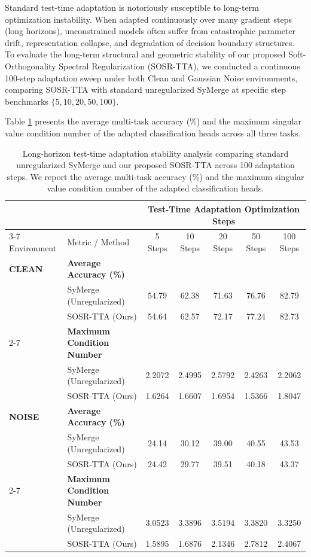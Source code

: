 \documentclass{article}
\theoremstyle{plain}
\theoremstyle{definition}
\theoremstyle{remark}
\begin{document}
Standard test-time adaptation is notoriously susceptible to long-term optimization instability. When adapted continuously over many gradient steps (long horizons), unconstrained models often suffer from catastrophic parameter drift, representation collapse, and degradation of decision boundary structures. To evaluate the long-term structural and geometric stability of our proposed Soft-Orthogonality Spectral Regularization (SOSR-TTA), we conducted a continuous 100-step adaptation sweep under both Clean and Gaussian Noise environments, comparing SOSR-TTA with standard unregularized SyMerge at specific step benchmarks $\{5, 10, 20, 50, 100\}$.

Table \ref{tab:horizon_stability_results} presents the average multi-task accuracy (\%) and the maximum singular value condition number of the adapted classification heads across all three tasks.

\begin{table}[htbp]
\caption{Long-horizon test-time adaptation stability analysis comparing standard unregularized SyMerge and our proposed SOSR-TTA across 100 adaptation steps. We report the average multi-task accuracy (\%) and the maximum singular value condition number of the adapted classification heads.}
\label{tab:horizon_stability_results}
\vskip 0.15in
\begin{center}
\begin{small}
\begin{tabular}{llccccc}
\toprule
& & \multicolumn{5}{c}{Test-Time Adaptation Optimization Steps} \\
\cmidrule{3-7}
Environment & Metric / Method & 5 Steps & 10 Steps & 20 Steps & 50 Steps & 100 Steps \\
\midrule
\textbf{CLEAN} & \textbf{Average Accuracy (\%)} & & & & & \\
 & \quad SyMerge (Unregularized) & 54.79 & 62.38 & 71.63 & 76.76 & 82.79 \\
 & \quad SOSR-TTA (Ours) & 54.64 & 62.57 & 72.17 & 77.24 & 82.73 \\
\cmidrule{2-7}
 & \textbf{Maximum Condition Number} & & & & & \\
 & \quad SyMerge (Unregularized) & 2.2072 & 2.4995 & 2.5792 & 2.4263 & 2.2062 \\
 & \quad SOSR-TTA (Ours) & 1.6264 & 1.6607 & 1.6954 & 1.5366 & 1.8047 \\
\midrule
\textbf{NOISE} & \textbf{Average Accuracy (\%)} & & & & & \\
 & \quad SyMerge (Unregularized) & 24.14 & 30.12 & 39.00 & 40.55 & 43.53 \\
 & \quad SOSR-TTA (Ours) & 24.42 & 29.77 & 39.51 & 40.18 & 43.37 \\
\cmidrule{2-7}
 & \textbf{Maximum Condition Number} & & & & & \\
 & \quad SyMerge (Unregularized) & 3.0523 & 3.3896 & 3.5194 & 3.3820 & 3.3250 \\
 & \quad SOSR-TTA (Ours) & 1.5895 & 1.6876 & 2.1346 & 2.7812 & 2.4067 \\
\bottomrule
\end{tabular}
\end{small}
\end{center}
\vskip -0.1in
\end{table}
\end{document}

